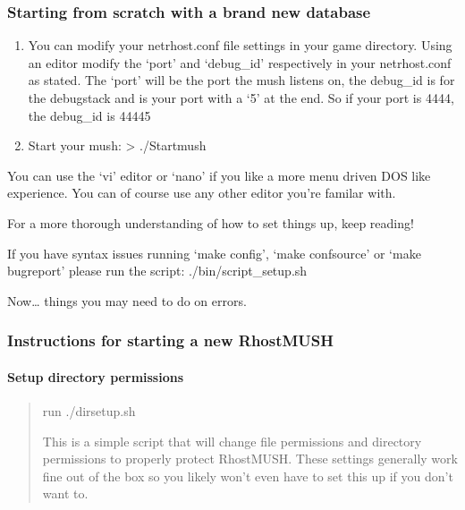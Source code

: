 \documentclass[letterpaper,10pt,english]{sphinxmanual}
\begin{document}
\subsubsection{Starting from scratch with a brand new database}
\label{\detokenize{installation:starting-from-scratch-with-a-brand-new-database}}\begin{enumerate}
%
\item {} 
\sphinxAtStartPar
You can modify your netrhost.conf file settings in your game directory.
Using an editor modify the ‘port’ and ‘debug\_id’ respectively in your netrhost.conf as stated.
The ‘port’ will be the port the mush listens on, the debug\_id is for the debug\sphinxhyphen{}stack and is
your port with a ‘5’ at the end.  So if your port is 4444, the debug\_id is 44445

\item {} 
\sphinxAtStartPar
Start your mush:
\textendash{}\textgreater{} ./Startmush

\end{enumerate}

\sphinxAtStartPar
You can use the ‘vi’ editor or ‘nano’ if you like a more menu driven DOS like experience.
You can of course use any other editor you’re familar with.

\sphinxAtStartPar
For a more thorough understanding of how to set things up, keep reading!

\sphinxAtStartPar
If you have syntax issues running ‘make config’, ‘make confsource’
or ‘make bugreport’ please run the script: ./bin/script\_setup.sh

\sphinxAtStartPar
Now… things you may need to do on errors.


\subsubsection{Instructions for starting a new RhostMUSH}
\label{\detokenize{installation:instructions-for-starting-a-new-rhostmush}}

\paragraph{Setup directory permissions}
\label{\detokenize{installation:setup-directory-permissions}}\begin{quote}

\sphinxAtStartPar
run ./dirsetup.sh

\sphinxAtStartPar
This is a simple script that will change file permissions
and directory permissions to properly protect RhostMUSH.
These settings generally work fine out of the box so
you likely won’t even have to set this up if you don’t want to.
\end{quote}
\end{document}
